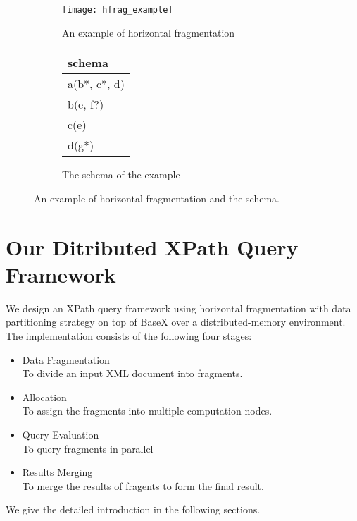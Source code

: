 \begin{figure}[t]
	\centering
	\begin{subfigure}{.6\textwidth}
		\centering
		\texttt{[image: hfrag\_example]}
		\caption{An example of horizontal fragmentation}
		\label{fig:sub1}
	\end{subfigure}%
	\begin{subfigure}{.4\textwidth}
		\centering
		\vspace{12mm}
		\begin{tabular}{|l|}
			\hline
			schema\\
			\hline
			a(b*, c*, d) \\
			b(e, f?) \\
			c(e) \\
			d(g*) \\
			\hline
		\end{tabular}
		\vspace{12mm}
		\caption{The schema of the example}
		\label{fig:sub2}
	\end{subfigure}
	\caption{An example of horizontal fragmentation and the schema.}
	\label{fig:hfrag_example}
\end{figure}

\section{Our Ditributed XPath Query Framework}

We design an XPath query framework using horizontal fragmentation with data
partitioning strategy on top of BaseX over a distributed-memory environment. 
The implementation consists of the following four stages:\\
\begin{itemize}
	\item Data Fragmentation \\To divide an input XML document into fragments.
	\item Allocation\\ To assign the fragments into multiple computation nodes.
	\item Query Evaluation\\ To query fragments in parallel
	\item Results Merging\\ To merge the results of fragents to form the final result.
\end{itemize}

We give the detailed introduction in the following sections.

